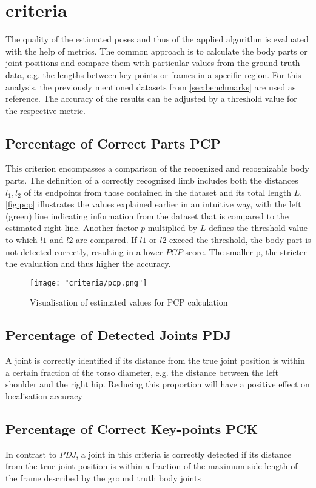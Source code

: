 \section{criteria}
The quality of the estimated poses and thus of the applied algorithm is evaluated with the help of metrics. The common approach is to calculate the body parts or joint positions and compare them with particular values from the ground truth data, e.g. the lengths between key-points or frames in a specific region. For this analysis, the previously mentioned datasets from \autoref{sec:benchmarks} are used as reference. The accuracy of the results can be adjusted by a threshold value for the respective metric.

\subsection{Percentage of Correct Parts PCP}
This criterion encompasses a comparison of the recognized and recognizable body parts. The definition of a correctly recognized limb includes both the distances $l_{1}, l_{2}$ of its endpoints from those contained in the dataset and its total length $L$. \autoref{fig:pcp} illustrates the values explained earlier in an intuitive way, with the left (green) line indicating information from the dataset that is compared to the estimated right line. Another factor $p$ multiplied by $L$ defines the threshold value to which $l1$ and $l2$ are compared. If $l1$ or $l2$ exceed the threshold, the body part is not detected correctly, resulting in a lower $PCP$ score.
The smaller p, the stricter the evaluation and thus higher the accuracy.\cite{pcp}

\begin{figure}[h]
\centering
\texttt{[image: "criteria/pcp.png"]}
\caption{Visualisation of estimated values for PCP calculation}
\label{fig:pcp}
\end{figure}

\subsection{Percentage of Detected Joints PDJ}
A joint is correctly identified if its distance from the true joint position is within a certain fraction of the torso diameter, e.g. the distance between the left shoulder and the right hip. Reducing this proportion will have a positive effect on localisation accuracy %

\subsection{Percentage of Correct Key-points PCK}
In contrast to \emph{PDJ}, a joint in this criteria is correctly detected if its distance from the true joint position is within a fraction of the maximum side length of the frame described by the ground truth body joints %

